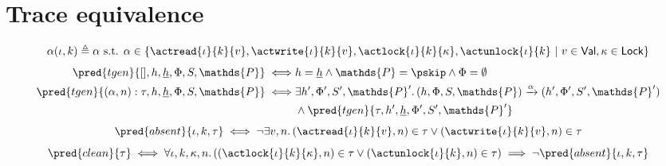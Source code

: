 \section{Trace equivalence}

\[
	\alpha(\iota, k) \triangleq \alpha \text{ s.t. }
	\alpha \in 
		\{
			\actread{\iota}{k}{v},
			\actwrite{\iota}{k}{v},
			\actlock{\iota}{k}{\kappa},
			\actunlock{\iota}{k}\
			|\ v \in \mathsf{Val}, \kappa \in \mathsf{Lock}
		\}
\]
\begin{align*}
	\pred{tgen}{[], h, \underline{h}, \Phi, S, \mathds{P}}
		\iff&
	h = \underline{h} \land \mathds{P} = \pskip \land \Phi = \emptyset
		\\
	\pred{tgen}{(\alpha, n) : \tau, h, \underline{h}, \Phi, S, \mathds{P}}
		\iff&
	\exists h', \Phi', S', \mathds{P}' \ldotp (h, \Phi, S, \mathds{P}) \xrightarrow{\alpha} (h', \Phi', S', \mathds{P}') \\ &\land \pred{tgen}{\tau, h', \underline{h}, \Phi', S', \mathds{P}'}
\end{align*}
\[
	\pred{absent}{\iota, k, \tau}
		\iff
	\lnot \exists v, n \ldotp (\actread{\iota}{k}{v}, n) \in \tau \lor (\actwrite{\iota}{k}{v}, n) \in \tau
\]
\[
	\pred{clean}{\tau} \iff \forall \iota, k, \kappa, n \ldotp \left( (\actlock{\iota}{k}{\kappa}, n) \in \tau \lor (\actunlock{\iota}{k}, n) \in \tau \right) \implies \lnot \pred{absent}{\iota, k, \tau}
\]


